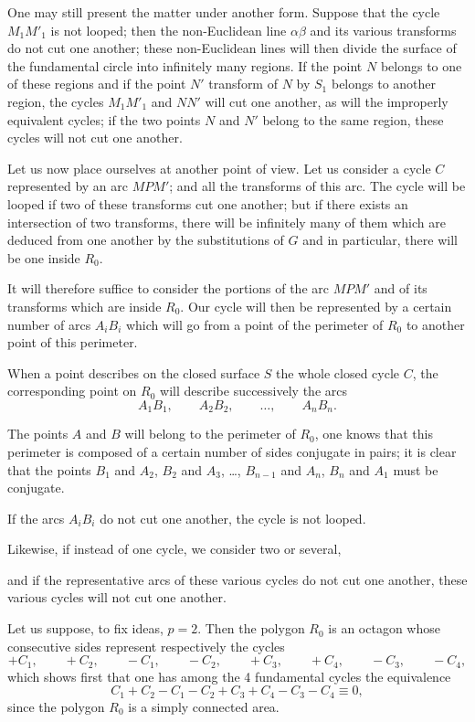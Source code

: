 \documentclass{article}
\begin{document}
One may still present the matter under another form. Suppose that the cycle $M_{1}M'_{1}$ is not looped; then the non-Euclidean line $\alpha\beta$ and its various transforms do not cut one another; these non-Euclidean lines will then divide the surface of the fundamental circle into infinitely many regions. If the point $N$ belongs to one of these regions and if the point $N'$ transform of $N$ by $S_{1}$ belongs to another region, the cycles $M_{1}M'_{1}$ and $NN'$ will cut one another, as will the improperly equivalent cycles; if the two points $N$ and $N'$ belong to the same region, these cycles will not cut one another.

Let us now place ourselves at another point of view. Let us consider a cycle $C$ represented by an arc $MPM'$; and all the transforms of this arc. The cycle will be looped if two of these transforms cut one another; but if there exists an intersection of two transforms, there will be infinitely many of them which are deduced from one another by the substitutions of $G$ and in particular, there will be one inside $R_{0}$.

It will therefore suffice to consider the portions of the arc $MPM'$ and of its transforms which are inside $R_{0}$. Our cycle will then be represented by a certain number of arcs $A_{i}B_{i}$ which will go from a point of the perimeter of $R_{0}$ to another point of this perimeter.

When a point describes on the closed surface $S$ the whole closed cycle $C$, the corresponding point on $R_{0}$ will describe successively the arcs
\[ A_{1}B_{1}, \qquad A_{2}B_{2}, \qquad \ldots, \qquad A_{n}B_{n}. \]

The points $A$ and $B$ will belong to the perimeter of $R_{0}$, one knows that this perimeter is composed of a certain number of sides conjugate in pairs; it is clear that the points $B_{1}$ and $A_{2}$, $B_{2}$ and $A_{3}$, \ldots, $B_{n-1}$ and $A_{n}$, $B_{n}$ and $A_{1}$ must be conjugate.

If the arcs $A_{i}B_{i}$ do not cut one another, the cycle is not looped.

Likewise, if instead of one cycle, we consider two or several,

and if the representative arcs of these various cycles do not cut one another, these various cycles will not cut one another.

Let us suppose, to fix ideas, $p = 2$. Then the polygon $R_{0}$ is an octagon whose consecutive sides represent respectively the cycles
\[ +C_{1}, \qquad +C_{2}, \qquad -C_{1}, \qquad -C_{2}, \qquad +C_{3}, \qquad +C_{4}, \qquad -C_{3}, \qquad -C_{4}, \]
which shows first that one has among the 4 fundamental cycles the equivalence
\[ C_{1} + C_{2} - C_{1} - C_{2} + C_{3} + C_{4} - C_{3} - C_{4} \equiv 0, \tag{26} \]
since the polygon $R_{0}$ is a simply connected area.
\end{document}
